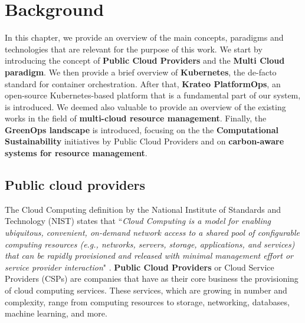 \chapter{Background}
\label{cha:background}

In this chapter, we provide an overview of the main concepts, paradigms and technologies that are relevant for the purpose of this work.
We start by introducing the concept of \textbf{Public Cloud Providers} and the \textbf{Multi Cloud paradigm}.
We then provide a brief overview of \textbf{Kubernetes}, the de-facto standard for container orchestration. 
After that, \textbf{Krateo PlatformOps}, an open-source Kubernetes-based platform that is a fundamental part of our system, is introduced.
We deemed also valuable to provide an overview of the existing works in the field of \textbf{multi-cloud resource management}. 
Finally, the \textbf{GreenOps landscape} is introduced, focusing on the the \textbf{Computational Sustainability} initiatives by Public Cloud Providers and on \textbf{carbon-aware systems for resource management}. 

\section{Public cloud providers}

The Cloud Computing definition by the National Institute of Standards and Technology (NIST) \cite{nist} states that ``\textit{Cloud Computing is a model for enabling ubiquitous, convenient, on-demand network access to a shared pool of configurable computing resources (e.g., networks, servers, storage, applications, and services) that can be rapidly provisioned and released with minimal management effort or service provider interaction}" \cite{nist}.
\textbf{Public Cloud Providers} or Cloud Service Providers (CSPs) are companies that have as their core business the provisioning of cloud computing services. These services, which are growing in number and complexity, range from computing resources to storage, networking, databases, machine learning, and more. 






